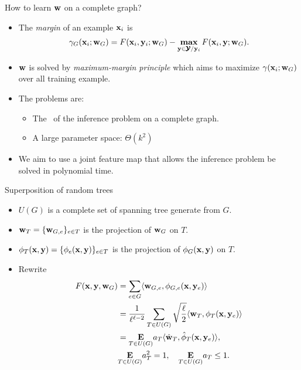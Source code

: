 \documentclass[first=dgreen,second=purple,logo=yellowexc]{aaltoslides}
\begin{document}
%
\begin{frame}{How to learn $\mathbf {w}$ on a complete graph?}
	\begin{itemize}
		\item The \textit{margin} of an example $\mathbf {x}_i$ is
		\begin{align*}
			\gamma_G(\mathbf {x}_i;\mathbf {w}_G) = F(\mathbf {x}_i,\mathbf {y}_i;\mathbf {w}_G) - \underset{\mathbf {y}\in\pmb {\mathcal{Y}}/\mathbf {y}_i}{\textbf{max}}\,F(\mathbf {x}_i,\mathbf {y};\mathbf {w}_G).
		\end{align*}
		\item $\mathbf {w}$ is solved by \textit{maximum-margin principle} which aims to maximize $\gamma(\mathbf {x}_i;\mathbf {w}_G)$ over all training example.
		\item The problems are:
		\begin{itemize}
			\item The \nphardness\ of the inference problem on a complete graph.
			\item A large parameter space: $\Theta(k^2)$
		\end{itemize}
		\item We aim to use a joint feature map that allows the inference problem be solved in polynomial time.
	\end{itemize}
\end{frame}



%
\begin{frame}{Superposition of random trees}
	\begin{itemize}
		\item $U(G)$ is a complete set of spanning tree generate from $G$.
		\item $\mathbf {w}_{T}=\{\mathbf {w}_{G,e}\}_{e\in T}$ is the projection of $\mathbf {w}_G$ on $T$.
		\item $\phi_T(\mathbf {x},\mathbf {y})=\{\phi_e(\mathbf {x},\mathbf {y})\}_{e\in T}$ is the projection of $\phi_G(\mathbf {x},\mathbf {y})$ on $T$.
		\item Rewrite
		\begin{align*}
			F(\mathbf {x},\mathbf {y},\mathbf {w}_G) &= \sum_{e\in G}\langle \mathbf {w}_{G,e}, \phi_{G,e}(\mathbf {x},\mathbf {y}_e) \rangle \\
			& = \frac{1}{\ell^{\ell-2}}\sum_{T\in U(G)}\sqrt{\frac{\ell}{2}}\langle \mathbf {w}_{T}, \phi_{T}(\mathbf {x},\mathbf {y}_e) \rangle\\
			& = \underset{T\in U(G)}{\mathrm{\mathbf{E}}}a_{T}\langle \hat{\mathbf {w}}_{T}, \hat{\phi}_{T}(\mathbf {x},\mathbf {y}_e) \rangle,\\
			&\underset{T\in U(G)}{\mathrm{\mathbf{E}}} a_T^2=1, \quad 	\underset{T\in U(G)}{\mathrm{\mathbf{E}}} a_T\le1.
		\end{align*}
	\end{itemize}
\end{frame}
\end{document}
